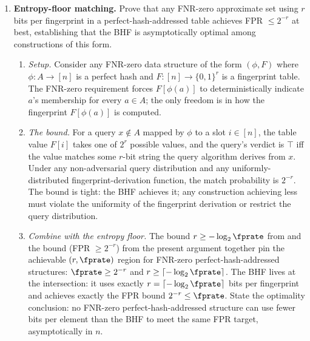 \begin{enumerate}
\item \exstarstarstar
\label{ex:ch14-11}
\textbf{Entropy-floor matching.}
Prove that any FNR-zero approximate set using $r$ bits per
fingerprint in a perfect-hash-addressed table achieves FPR
$\le 2^{-r}$ at best, establishing that the BHF is asymptotically
optimal among constructions of this form.
\begin{enumerate}
  \item[(a)] \emph{Setup.} Consider any FNR-zero data structure of
    the form $(\phi, F)$ where $\phi : A \to [n]$ is a perfect
    hash and $F : [n] \to \{0, 1\}^r$ is a fingerprint table. The
    FNR-zero requirement forces $F[\phi(a)]$ to deterministically
    indicate $a$'s membership for every $a \in A$; the only
    freedom is in how the fingerprint $F[\phi(a)]$ is computed.
  \item[(b)] \emph{The bound.} For a query $x \notin A$ mapped by
    $\phi$ to a slot $i \in [n]$, the table value $F[i]$ takes one
    of $2^r$ possible values, and the query's verdict is $\top$ iff
    the value matches some $r$-bit string the query algorithm
    derives from $x$. Under any non-adversarial query distribution
    and any uniformly-distributed fingerprint-derivation function,
    the match probability is $2^{-r}$. The bound is tight: the
    BHF achieves it; any construction achieving less must violate
    the uniformity of the fingerprint derivation or restrict the
    query distribution.
  \item[(c)] \emph{Combine with the entropy floor.} The bound $r
    \ge -\log_2 \fprate$ from  and the
    bound (FPR $\ge 2^{-r}$) from the present argument together
    pin the achievable $(r, \fprate)$ region for FNR-zero
    perfect-hash-addressed structures: $\fprate \ge 2^{-r}$ and
    $r \ge \lceil -\log_2 \fprate \rceil$. The BHF lives at the
    intersection: it uses exactly $r = \lceil -\log_2 \fprate
    \rceil$ bits per fingerprint and achieves exactly the FPR
    bound $2^{-r} \le \fprate$. State the optimality conclusion:
    no FNR-zero perfect-hash-addressed structure can use fewer
    bits per element than the BHF to meet the same FPR target,
    asymptotically in $n$.
\end{enumerate}

\end{enumerate}
